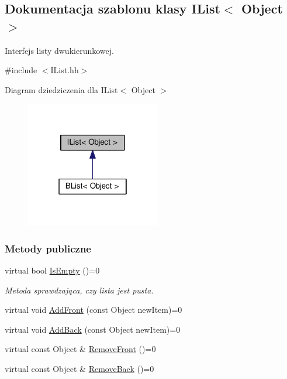 \hypertarget{class_i_list}{\subsection{Dokumentacja szablonu klasy I\-List$<$ Object $>$}
\label{class_i_list}
}


Interfejs listy dwukierunkowej.  




{\ttfamily \#include $<$I\-List.\-hh$>$}



Diagram dziedziczenia dla I\-List$<$ Object $>$
\nopagebreak
\begin{figure}[H]
\begin{center}
\leavevmode
\includegraphics[width=166pt]{class_i_list__inherit__graph}
\end{center}
\end{figure}
\subsubsection*{Metody publiczne}
\begin{DoxyCompactItemize}
\item 
virtual bool \hyperlink{class_i_list_a6a67d956d023bd003fd4a19e766d475c}{Is\-Empty} ()=0
\begin{DoxyCompactList}\small\item\em Metoda sprawdzająca, czy lista jest pusta. \end{DoxyCompactList}\item 
virtual void \hyperlink{class_i_list_a8015c8bd4e35161d31f863e74e943329}{Add\-Front} (const Object new\-Item)=0
\item 
virtual void \hyperlink{class_i_list_a62af6638df7793dc5696c716122e1fc8}{Add\-Back} (const Object new\-Item)=0
\item 
virtual const Object \& \hyperlink{class_i_list_a61e3afad71d99da6b85148e61fa01e9b}{Remove\-Front} ()=0
\item 
virtual const Object \& \hyperlink{class_i_list_ab4db42b40d2b583a26b1c3b398769e15}{Remove\-Back} ()=0
\end{DoxyCompactItemize}


